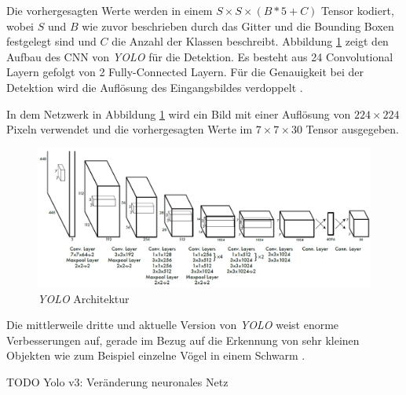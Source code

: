 \newpage

Die vorhergesagten Werte werden in einem $S \times S \times (B * 5 + C)$ Tensor kodiert, wobei $S$ und $B$ wie zuvor beschrieben durch das Gitter und die Bounding Boxen festgelegt sind und $C$ die Anzahl der Klassen beschreibt. Abbildung \ref{yolo_architecture} zeigt den Aufbau des CNN von \textit{YOLO} für die Detektion. Es besteht aus 24 Convolutional Layern gefolgt von 2 Fully-Connected Layern. Für die Genauigkeit bei der Detektion wird die Auflösung des Eingangsbildes verdoppelt \cite{JosephRedmon.2016}. 

In dem Netzwerk in Abbildung \ref{yolo_architecture} wird ein Bild mit einer Auflösung von $224 \times 224$ Pixeln verwendet und die vorhergesagten Werte im $7 \times 7 \times 30$ Tensor ausgegeben.

\begin{figure}[ht]
	\begin{center}
		\includegraphics[width=15cm]{Bilder/yolo_architecture.png} 
		\caption{\textit{YOLO} Architektur \cite{JosephRedmon.2016}}
		\label{yolo_architecture}
	\end{center}
\end{figure}

Die mittlerweile dritte und aktuelle Version von \textit{YOLO} weist enorme Verbesserungen auf, gerade im Bezug auf die Erkennung von sehr kleinen Objekten wie zum Beispiel einzelne Vögel in einem Schwarm \cite{JosephRedmon.2018}.

TODO Yolo v3: Veränderung neuronales Netz





